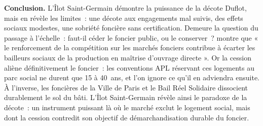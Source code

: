 \documentclass[a4paper,12pt]{article}
\begin{document}
\vspace{0.2em}
\noindent\textbf{Conclusion.} L'Îlot Saint-Germain démontre la puissance de la décote Duflot, mais en révèle les limites~: une décote aux engagements mal suivis, des effets sociaux modestes, une sobriété foncière sans certification. Demeure la question du passage à l'échelle~: faut-il céder le foncier public, ou le conserver~? \textcite{LeBrun2025OFS} montre que « le renforcement de la compétition sur les marchés fonciers contribue à écarter les bailleurs sociaux de la production en maîtrise d'ouvrage directe ». Or la cession aliène définitivement le foncier~: les conventions APL réservant ces logements au parc social ne durent que 15 à 40~ans, et l'on ignore ce qu'il en adviendra ensuite. À l'inverse, les foncières de la Ville de Paris et le Bail Réel Solidaire dissocient durablement le sol du bâti. L'Îlot Saint-Germain révèle ainsi le paradoxe de la décote~: un instrument puissant là où le marché exclut le logement social, mais dont la cession contredit son objectif de démarchandisation durable du foncier.

\vspace{1.5em}
\begin{singlespace}
\small\printbibliography[title=Bibliographie]
\end{singlespace}
\end{document}
